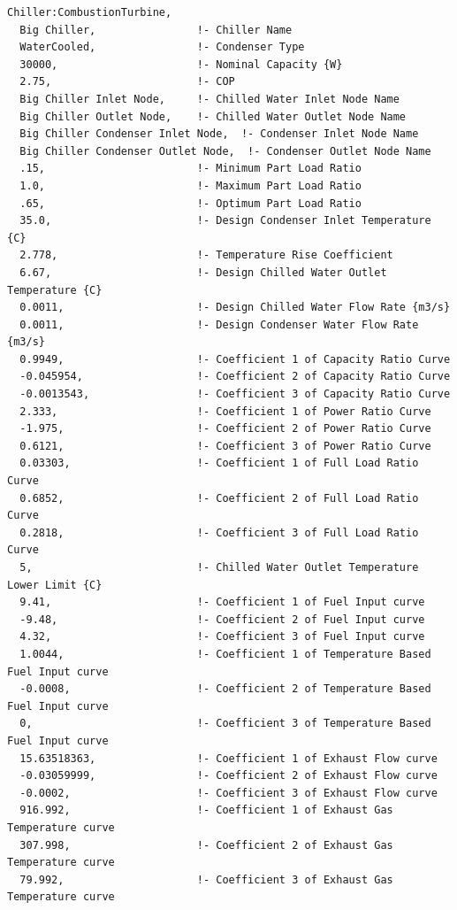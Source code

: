 \begin{lstlisting}
Chiller:CombustionTurbine,
  Big Chiller,                !- Chiller Name
  WaterCooled,                !- Condenser Type
  30000,                      !- Nominal Capacity {W}
  2.75,                       !- COP
  Big Chiller Inlet Node,     !- Chilled Water Inlet Node Name
  Big Chiller Outlet Node,    !- Chilled Water Outlet Node Name
  Big Chiller Condenser Inlet Node,  !- Condenser Inlet Node Name
  Big Chiller Condenser Outlet Node,  !- Condenser Outlet Node Name
  .15,                        !- Minimum Part Load Ratio
  1.0,                        !- Maximum Part Load Ratio
  .65,                        !- Optimum Part Load Ratio
  35.0,                       !- Design Condenser Inlet Temperature {C}
  2.778,                      !- Temperature Rise Coefficient
  6.67,                       !- Design Chilled Water Outlet Temperature {C}
  0.0011,                     !- Design Chilled Water Flow Rate {m3/s}
  0.0011,                     !- Design Condenser Water Flow Rate {m3/s}
  0.9949,                     !- Coefficient 1 of Capacity Ratio Curve
  -0.045954,                  !- Coefficient 2 of Capacity Ratio Curve
  -0.0013543,                 !- Coefficient 3 of Capacity Ratio Curve
  2.333,                      !- Coefficient 1 of Power Ratio Curve
  -1.975,                     !- Coefficient 2 of Power Ratio Curve
  0.6121,                     !- Coefficient 3 of Power Ratio Curve
  0.03303,                    !- Coefficient 1 of Full Load Ratio Curve
  0.6852,                     !- Coefficient 2 of Full Load Ratio Curve
  0.2818,                     !- Coefficient 3 of Full Load Ratio Curve
  5,                          !- Chilled Water Outlet Temperature Lower Limit {C}
  9.41,                       !- Coefficient 1 of Fuel Input curve
  -9.48,                      !- Coefficient 2 of Fuel Input curve
  4.32,                       !- Coefficient 3 of Fuel Input curve
  1.0044,                     !- Coefficient 1 of Temperature Based Fuel Input curve
  -0.0008,                    !- Coefficient 2 of Temperature Based Fuel Input curve
  0,                          !- Coefficient 3 of Temperature Based Fuel Input curve
  15.63518363,                !- Coefficient 1 of Exhaust Flow curve
  -0.03059999,                !- Coefficient 2 of Exhaust Flow curve
  -0.0002,                    !- Coefficient 3 of Exhaust Flow curve
  916.992,                    !- Coefficient 1 of Exhaust Gas Temperature curve
  307.998,                    !- Coefficient 2 of Exhaust Gas Temperature curve
  79.992,                     !- Coefficient 3 of Exhaust Gas Temperature curve

\end{lstlisting}
